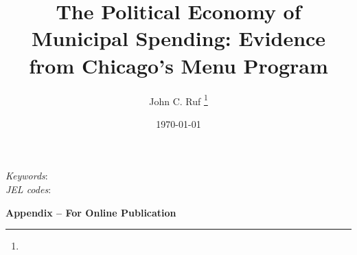 \documentclass[11pt]{article}
\title{The Political Economy of Municipal Spending:
Evidence from Chicago’s Menu Program}
\author{John C. Ruf \thanks{\rufemail}}
\date{\today}
\renewcommand{\=}[1]{\stackrel{#1}{=}} %
\theoremstyle{definition}
\begin{document}

\maketitle

\begin{abstract}

\end{abstract}
\vspace{1cm}
{\small
\noindent \textit{Keywords}:  \\
\textit{JEL codes}: 
}
\thispagestyle{empty}
\newpage
\setcounter{page}{1}


%
%
%
%









{}

\newpage
\clearpage

\begin{center} \Large \textbf{Appendix -- For Online Publication} \end{center}
\appendix
{}


%
%
\end{document}

